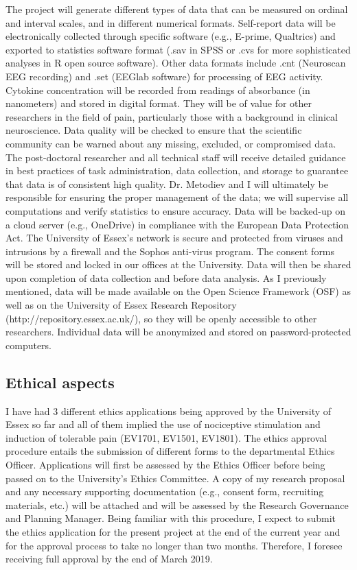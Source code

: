 \documentclass[twocolumn, serif, rga, numeric]{jote-article}
\begin{document}
The project will generate different types of data that can be measured
on ordinal and interval scales, and in different numerical formats.
Self-report data will be electronically collected through specific
software (e.g., E-prime, Qualtrics) and exported to statistics software
format (.sav in SPSS or .cvs for more sophisticated analyses in R open
source software). Other data formats include .cnt (Neuroscan EEG
recording) and .set (EEGlab software) for processing of EEG activity.
Cytokine concentration will be recorded from readings of absorbance (in
nanometers) and stored in digital format. They will be of value for
other researchers in the field of pain, particularly those with a
background in clinical neuroscience. Data quality will be checked to
ensure that the scientific community can be warned about any missing,
excluded, or compromised data. The post-doctoral researcher and all
technical staff will receive detailed guidance in best practices of task
administration, data collection, and storage to guarantee that data is
of consistent high quality. Dr. Metodiev and I will ultimately be
responsible for ensuring the proper management of the data; we will
supervise all computations and verify statistics to ensure accuracy.
Data will be backed-up on a cloud server (e.g., OneDrive) in compliance
with the European Data Protection Act. The University of Essex's network
is secure and protected from viruses and intrusions by a firewall and
the Sophos anti-virus program. The consent forms will be stored and
locked in our offices at the University. Data will then be shared upon
completion of data collection and before data analysis. As I previously
mentioned, data will be made available on the Open Science Framework
(OSF) as well as on the University of Essex Research Repository
(http://repository.essex.ac.uk/), so they will be openly accessible to
other researchers. Individual data will be anonymized and stored on
password-protected computers.


\subsection*{Ethical aspects}


I have had 3 different ethics applications being approved by the
University of Essex so far and all of them implied the use of
nociceptive stimulation and induction of tolerable pain (EV1701, EV1501,
EV1801). The ethics approval procedure entails the submission of
different forms to the departmental Ethics Officer. Applications will
first be assessed by the Ethics Officer before being passed on to the
University's Ethics Committee. A copy of my research proposal and any
necessary supporting documentation (e.g., consent form, recruiting
materials, etc.) will be attached and will be assessed by the Research
Governance and Planning Manager. Being familiar with this procedure, I
expect to submit the ethics application for the present project at the
end of the current year and for the approval process to take no longer
than two months. Therefore, I foresee receiving full approval by the end
of March 2019.
\end{document}
